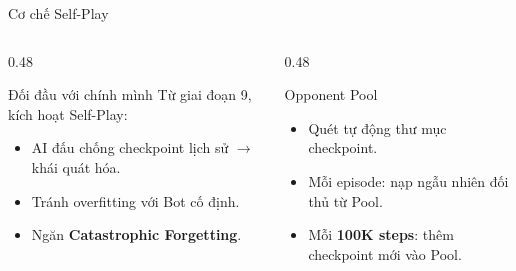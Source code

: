 \documentclass[aspectratio=169]{beamer}
\begin{document}
\begin{frame}{Cơ chế Self-Play}
  \begin{columns}[T]
    \begin{column}{0.48\textwidth}
      \begin{block}{Đối đầu với chính mình}
        Từ giai đoạn 9, kích hoạt Self-Play:
        \begin{itemize}
          \item AI đấu chống checkpoint lịch sử $\to$ khái quát hóa.
          \item Tránh overfitting với Bot cố định.
          \item Ngăn \textbf{Catastrophic Forgetting}.
        \end{itemize}
      \end{block}
    \end{column}
    \begin{column}{0.48\textwidth}
      \begin{block}{Opponent Pool}
        \begin{itemize}
          \item Quét tự động thư mục checkpoint.
          \item Mỗi episode: nạp ngẫu nhiên đối thủ từ Pool.
          \item Mỗi \textbf{100K steps}: thêm checkpoint mới vào Pool.
        \end{itemize}
      \end{block}
    \end{column}
  \end{columns}
\end{frame}
\end{document}
